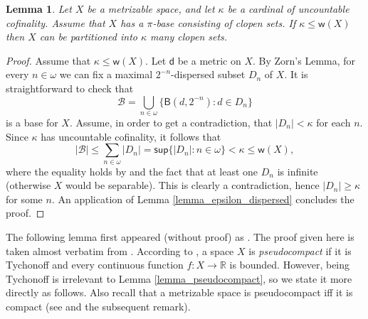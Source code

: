 \documentclass{amsart}
\theoremstyle{plain}
\newtheorem{lemma}[theorem]{Lemma}
\theoremstyle{definition}
\newcommand{\Ball}{\mathsf{B}}
\newcommand{\di}{\mathsf{d}}
\newcommand{\weight}{\mathsf{w}}
\newcommand{\supi}{\mathsf{sup}}
\newcommand{\BB}{\mathcal{B}}
\newcommand{\RRR}{\mathbb{R}}
\begin{document}
\begin{lemma}\label{lemma_uncountable_cofinality}
Let $X$ be a metrizable space, and let $\kappa$ be a cardinal of uncountable cofinality. Assume that $X$ has a $\pi$-base consisting of clopen sets. If $\kappa\leq\weight(X)$ then $X$ can be partitioned into $\kappa$ many clopen sets.
\end{lemma}
\begin{proof}
Assume that $\kappa\leq\weight(X)$. Let $\di$ be a metric on $X$. By Zorn's Lemma, for every $n\in\omega$ we can fix a maximal $2^{-n}$-dispersed subset $D_n$ of $X$. It is straightforward to check that
$$
\BB=\bigcup_{n\in\omega}\{\Ball(d,2^{-n}):d\in D_n\}
$$
is a base for $X$. Assume, in order to get a contradiction, that $|D_n|<\kappa$ for each $n$. Since $\kappa$ has uncountable cofinality, it follows that
$$
|\BB|\leq\sum_{n\in\omega}|D_n|=\supi\{|D_n|:n\in\omega\}<\kappa\leq\weight(X),
$$
where the equality holds by \cite[Lemma 5.8]{jech} and the fact that at least one $D_n$ is infinite (otherwise $X$ would be separable). This is clearly a contradiction, hence $|D_n|\geq\kappa$ for some $n$. An application of Lemma \ref{lemma_epsilon_dispersed} concludes the proof.
\end{proof}

The following lemma first appeared (without proof) as \cite[Lemma 3]{medini_products}. The proof given here is taken almost verbatim from \cite[Lemma 3.3]{medini_thesis}. According to \cite{engelking}, a space $X$ is \emph{pseudocompact} if it is Tychonoff and every continuous function $f:X\longrightarrow\RRR$ is bounded. However, being Tychonoff is irrelevant to Lemma \ref{lemma_pseudocompact}, so we state it more directly as follows. Also recall that a metrizable space is pseudocompact iff it is compact (see \cite[Theorem 4.1.17]{engelking} and the subsequent remark).

\enlargethispage{\baselineskip} 
\end{document}
